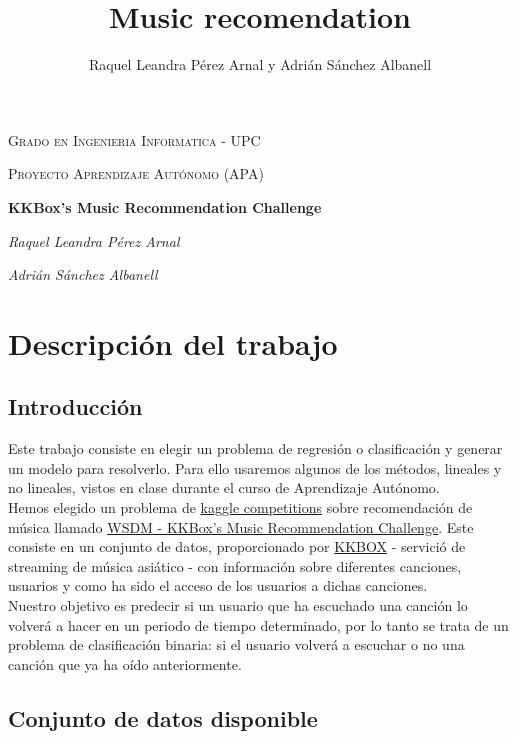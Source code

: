 \documentclass[a4paper]{article}
\title{Music recomendation}
\author{Raquel Leandra Pérez Arnal y Adrián Sánchez Albanell}
\date{} %
\begin{document}
\begin{titlepage}
	\centering
	{\scshape\LARGE Grado en Ingenieria Informatica - UPC \par}
	\vspace{1cm}
	{\scshape\Large Proyecto Aprendizaje Autónomo (APA)\par}
	\vspace{1.5cm}
	{\huge\bfseries KKBox's Music Recommendation Challenge\par}
	\vspace{2cm}
	{\Large\itshape Raquel Leandra Pérez Arnal\par}
	{\Large\itshape Adrián Sánchez Albanell\par}
\end{titlepage}
\clearpage
{\hypersetup{linkcolor=black}
\tableofcontents
}
\cleardoublepage

\section{Descripción del trabajo}


\subsection{Introducción}

Este trabajo consiste en elegir un problema de regresión o clasificación y generar un modelo para resolverlo. Para ello usaremos algunos de los métodos, lineales y no lineales, vistos en clase durante el curso de Aprendizaje Autónomo.\\

Hemos elegido un problema de \href{https://www.kaggle.com/competitions}{kaggle competitions} sobre recomendación de música llamado \href{https://www.kaggle.com/c/kkbox-music-recommendation-challenge}{WSDM - KKBox's Music Recommendation Challenge}. Este consiste en un conjunto de datos, proporcionado por \href{https://www.kkbox.com/intl/index.php?area=intl}{KKBOX} - servició de streaming de música asiático - con información sobre diferentes canciones, usuarios y como ha sido el acceso de los usuarios a dichas canciones.\\

Nuestro objetivo es predecir si un usuario que ha escuchado una canción lo volverá a hacer en un periodo de tiempo determinado, por lo tanto se trata de un problema de clasificación binaria: si el usuario volverá a escuchar o no una canción que ya ha oído anteriormente.


\subsection{Conjunto de datos disponible}
\end{document}
